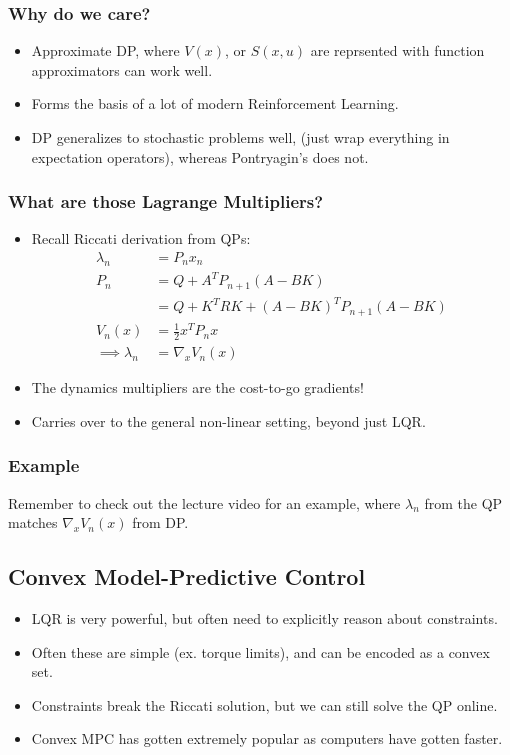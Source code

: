 \subsubsection{Why do we care?}
\begin{itemize}
    \item Approximate DP, where $V(x)$, or $S(x,u)$ are reprsented with function approximators can work well.
    \item Forms the basis of a lot of modern Reinforcement Learning.
    \item DP generalizes to stochastic problems well, (just wrap everything in expectation operators), whereas Pontryagin's does not.
\end{itemize}

\subsubsection{What are those Lagrange Multipliers?}
\begin{itemize}
    \item Recall Riccati derivation from QPs:
    \begin{align}
        \lambda_n &= P_n x_n \\
        P_n &= Q + A^T P_{n+1} (A-BK) \\
        &= Q + K^T R K + (A-BK)^T P_{n+1} (A-BK) \\
        V_n(x) &= \frac{1}{2} x^T P_n x \\
        \implies \lambda_n &= \nabla_x V_n(x)
    \end{align}
    \item The dynamics multipliers are the cost-to-go gradients!
    \item Carries over to the general non-linear setting, beyond just LQR.
\end{itemize}

\subsubsection{Example}
Remember to check out the lecture video for an example, where $\lambda_n$ from the QP matches $\nabla_x V_n(x)$ from DP.

\subsection{Convex Model-Predictive Control}
\begin{itemize}
    \item LQR is very powerful, but often need to explicitly reason about constraints.
    \item Often these are simple (ex. torque limits), and can be encoded as a convex set.
    \item Constraints break the Riccati solution, but we can still solve the QP online.
    \item Convex MPC has gotten extremely popular as computers have gotten faster.
\end{itemize}


